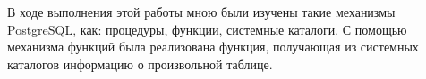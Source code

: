 В ходе выполнения этой работы мною были изучены такие механизмы
PostgreSQL, как: процедуры, функции, системные каталоги.
С помощью механизма функций была реализована функция, получающая
из системных каталогов информацию о произвольной таблице.

